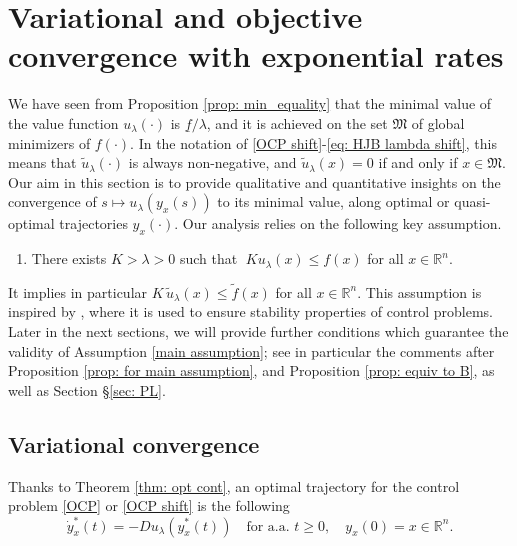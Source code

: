 \documentclass[12pt]{amsart}
\numberwithin{equation}{section}
\theoremstyle{plain}
\begin{document}
\section{Variational and objective convergence with exponential rates} \label{sec: conv rate}


We have seen from Proposition \ref{prop: min_equality} that the minimal value of the value function $u_{\lambda}(\cdot)$ is $\underline{f}/\lambda$, and it is achieved on the set $\mathfrak{M}$ of global minimizers of $f(\cdot)$. In the notation of \eqref{OCP shift}-\eqref{eq: HJB lambda shift}, this means that $\tilde{u}_{\lambda}(\cdot)$ is always non-negative, and $\tilde{u}_{\lambda}(x)=0$ if and only if $x\in \mathfrak{M}$. Our aim in this section is to provide qualitative and quantitative insights on the convergence of $s\mapsto u_{\lambda}(y_{x}(s))$ to its minimal value, along optimal or quasi-optimal trajectories $y_{x}(\cdot)$.
Our analysis relies on the following key assumption.
\begin{enumerate}[label=\textbf{(B)}]
    \item\label{main assumption} There exists $K>\lambda>0$ such that $\; K u_\lambda(x) \leq f(x)$ for all $x\in\mathbb{R}^n$.
\end{enumerate}
It implies in particular $K \,\tilde{u}_{\lambda}(x) \leq \tilde{f}(x)$  for all $x\in\mathbb{R}^n$.  This assumption is inspired by \cite[Assumption 2.3]{gaitsgory2015stabilization}, where it is used to ensure stability properties of  control problems. 
Later in the next sections, we will provide further conditions which guarantee the validity of Assumption \ref{main assumption}; see in particular the comments after Proposition \ref{prop: for main assumption}, and Proposition \ref{prop: equiv to B}, as well as Section \S\ref{sec: PL}.



\subsection{Variational convergence}

Thanks to Theorem \ref{thm: opt cont}, an optimal trajectory for the control problem \eqref{OCP} or \eqref{OCP shift} is the following 
\begin{equation}\label{eq: opt traj}
    \dot{y}^{*}_{x}(t) = -Du_{\lambda}(y^{*}_{x}(t)) \quad \text{for a.a. } t\geq 0, \quad y_{x}(0)=x\in\mathbb{R}^{n}.
\end{equation}
\end{document}

